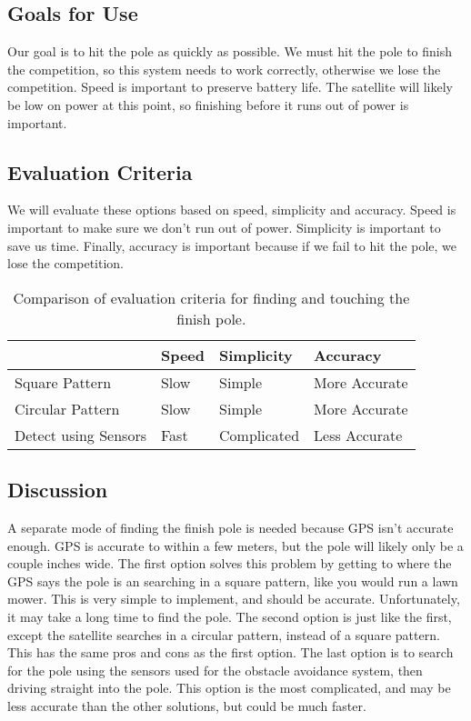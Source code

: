 \documentclass[10pt,serif,draftclsnofoot,onecolumn]{IEEEtran}
\begin{document}
\subsection{Goals for Use}
Our goal is to hit the pole as quickly as possible. We must hit the pole to finish the competition, so this system needs to work correctly, otherwise we lose the competition. Speed is important to preserve battery life. The satellite will likely be low on power at this point, so finishing before it runs out of power is important.

\subsection{Evaluation Criteria}
We will evaluate these options based on speed, simplicity and accuracy. Speed is important to make sure we don’t run out of power. Simplicity is important to save us time. Finally, accuracy is important because if we fail to hit the pole, we lose the competition.

\begin{table}[h!]
  \centering
  \caption{Comparison of evaluation criteria for finding and touching the finish pole.}
  \label{tab:table1}
  \begin{tabular}{l||l|l|l}
                          & Speed & Simplicity   & Accuracy \\
    \hline
    Square Pattern        & Slow  & Simple       & More Accurate  \\
    \hline
    Circular Pattern      & Slow  & Simple       & More Accurate \\
    \hline
    Detect using Sensors  & Fast  & Complicated  & Less Accurate  \\
  \end{tabular}
\end{table}

\subsection{Discussion}
A separate mode of finding the finish pole is needed because GPS isn’t accurate enough. GPS is accurate to within a few meters, but the pole will likely only be a couple inches wide. The first option solves this problem by getting to where the GPS says the pole is an searching in a square pattern, like you would run a lawn mower. This is very simple to implement, and should be accurate. Unfortunately, it may take a long time to find the pole. The second option is just like the first, except the satellite searches in a circular pattern, instead of a square pattern. This has the same pros and cons as the first option. The last option is to search for the pole using the sensors used for the obstacle avoidance system, then driving straight into the pole. This option is the most complicated, and may be less accurate than the other solutions, but could be much faster.
\end{document}
